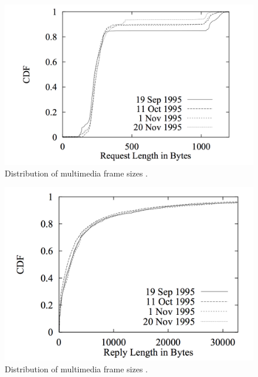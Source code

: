 \documentclass{llncs}
\begin{document}
\begin{figure}
\begin{center}
\includegraphics[scale=0.35]{histogram1.png}
\caption{Distribution of multimedia frame sizes \cite{mah1997empirical}.}
\label{fig:histogram1}
\end{center}
\end{figure}

\begin{figure}
\begin{center}
\includegraphics[scale=0.35]{histogram2.png}
\caption{Distribution of multimedia frame sizes \cite{mah1997empirical}.}
\label{fig:histogram2}
\end{center}
\end{figure}
\end{document}
